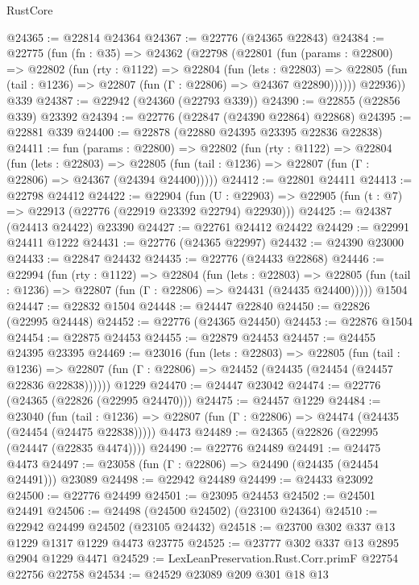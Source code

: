 \begin{lexlean}{RustCore}
\begin{coremodule}
@24365 := @22814 @24364
@24367 := @22776 (@24365 @22843)
@24384 := @22775
    (fun (fn : @35) =>
    @24362
      (@22798
        (@22801
          (fun (params : @22800) =>
          @22802
            (fun (rty : @1122) =>
            @22804
              (fun (lets : @22803) =>
              @22805 (fun (tail : @1236) => @22807 (fun (Γ : @22806) => @24367 @22890))))))
        @22936))
    @339
@24387 := @22942 (@24360 (@22793 @339))
@24390 := @22855 (@22856 @339) @23392
@24394 := @22776 (@22847 (@24390 @22864) @22868)
@24395 := @22881 @339
@24400 := @22878 (@22880 @24395 @23395 @22836 @22838)
@24411 := fun (params : @22800) =>
  @22802
    (fun (rty : @1122) =>
    @22804
      (fun (lets : @22803) =>
      @22805 (fun (tail : @1236) => @22807 (fun (Γ : @22806) => @24367 (@24394 @24400)))))
@24412 := @22801 @24411
@24413 := @22798 @24412
@24422 := @22904
    (fun (U : @22903) => @22905 (fun (t : @7) => @22913 (@22776 (@22919 @23392 @22794) @22930)))
@24425 := @24387 (@24413 @24422) @23390
@24427 := @22761 @24412 @24422
@24429 := @22991 @24411 @1222
@24431 := @22776 (@24365 @22997)
@24432 := @24390 @23000
@24433 := @22847 @24432
@24435 := @22776 (@24433 @22868)
@24446 := @22994
    (fun (rty : @1122) =>
    @22804
      (fun (lets : @22803) =>
      @22805 (fun (tail : @1236) => @22807 (fun (Γ : @22806) => @24431 (@24435 @24400)))))
    @1504
@24447 := @22832 @1504
@24448 := @24447 @22840
@24450 := @22826 (@22995 @24448)
@24452 := @22776 (@24365 @24450)
@24453 := @22876 @1504
@24454 := @22875 @24453
@24455 := @22879 @24453
@24457 := @24455 @24395 @23395
@24469 := @23016
    (fun (lets : @22803) =>
    @22805
      (fun (tail : @1236) =>
      @22807 (fun (Γ : @22806) => @24452 (@24435 (@24454 (@24457 @22836 @22838))))))
    @1229
@24470 := @24447 @23042
@24474 := @22776 (@24365 (@22826 (@22995 @24470)))
@24475 := @24457 @1229
@24484 := @23040
    (fun (tail : @1236) => @22807 (fun (Γ : @22806) => @24474 (@24435 (@24454 (@24475 @22838)))))
    @4473
@24489 := @24365 (@22826 (@22995 (@24447 (@22835 @4474))))
@24490 := @22776 @24489
@24491 := @24475 @4473
@24497 := @23058 (fun (Γ : @22806) => @24490 (@24435 (@24454 @24491))) @23089
@24498 := @22942 @24489
@24499 := @24433 @23092
@24500 := @22776 @24499
@24501 := @23095 @24453
@24502 := @24501 @24491
@24506 := @24498 (@24500 @24502) (@23100 @24364)
@24510 := @22942 @24499 @24502 (@23105 @24432)
@24518 := @23700 @302 @337 @13 @1229 @1317 @1229 @4473 @23775
@24525 := @23777 @302 @337 @13 @2895 @2904 @1229 @4471
@24529 := LexLeanPreservation.Rust.Corr.primF @22754 @22756 @22758
@24534 := @24529 @23089 @209 @301 @18 @13

\end{coremodule}
\end{lexlean}
